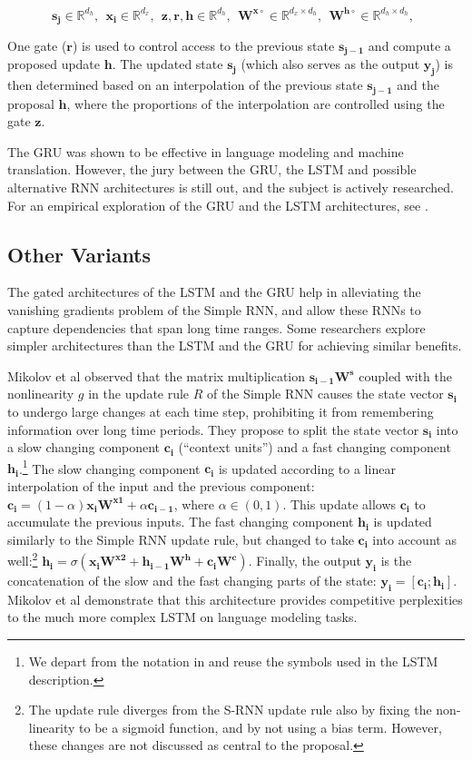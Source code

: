 \documentclass[jair,twoside,11pt,theapa]{article}
\newcommand{\m}[1]{\mathbf{#1}}%
\renewcommand{\shortcite}[0]{\citeyear}
\begin{document}
{\[
\m{s_j} \in \mathbb{R}^{d_h}, \,\;
\m{x_i} \in \mathbb{R}^{d_x}, \,\;
\m{z},\m{r},\m{h} \in \mathbb{R}^{d_h}, \,\;
\m{W^{x\circ}} \in \mathbb{R}^{d_x \times d_h}, \,\;
\m{W^{h\circ}} \in \mathbb{R}^{d_h \times d_h}, \,\;
\]

\noindent One gate ($\m{r}$) is used to control access to the previous state $\m{s_{j-1}}$ and compute a proposed update $\m{h}$. The updated state
$\m{s_j}$ (which also serves as the output $\m{y_j}$) is then determined based on an interpolation of the previous state $\m{s_{j-1}}$ and the proposal $\m{h}$,
where the proportions of the interpolation are controlled using the gate $\m{z}$.

The GRU was shown to be effective in language modeling and machine
translation.
However, the jury between the GRU, the LSTM and possible alternative
RNN architectures is still out, and the subject is actively researched.
For an empirical exploration of the GRU and the LSTM architectures, see
\cite{jozefowicz2015empirical}.

\subsection{Other Variants}
The gated architectures of the LSTM and the GRU help in alleviating the
vanishing gradients problem of the Simple RNN, and allow these RNNs to capture
dependencies that span long time ranges.
Some researchers explore simpler architectures than the LSTM and the GRU for
achieving similar benefits.

Mikolov et al \shortcite{mikolov2014learning} observed that the matrix
multiplication $\m{s_{i-1}}\m{W^{s}}$ coupled with the nonlinearity $g$ in the update rule $R$
of the Simple RNN causes the state vector $\m{s_i}$ to undergo large changes
at each time step, prohibiting it from remembering information over long time
periods. They propose to split the state vector $\m{s_i}$ into a slow changing component
$\m{c_i}$ (``context units'') and a fast changing component $\m{h_i}$.\footnote{We
depart from the notation in \cite{mikolov2014learning} and reuse the
symbols used in the LSTM description.}
The slow changing component $\m{c_i}$ is updated according to a linear interpolation
of the input and the previous component:
$\m{c_i} =
(1-\alpha)\m{x_i}\m{W^{x1}} + \alpha\m{c_{i-1}}$, where $\alpha \in (0,1)$. This
update allows $\m{c_i}$ to accumulate the previous inputs.  The fast changing
component $\m{h_i}$ is updated similarly to the Simple RNN update rule, 
but changed to take $\m{c_i}$ into account as well:\footnote{The update rule
diverges from the S-RNN update rule also by fixing the non-linearity to be
a sigmoid function, and by not using a bias term. However, these changes are
not discussed as central to the proposal.}
$\m{h_i} = \sigma(\m{x_i}\m{W^{x2}} + \m{h_{i-1}}\m{W^h} + \m{c_i}\m{W^c})$.
Finally, the output $\m{y_i}$ is the concatenation of the slow and the fast
changing parts of the state: $\m{y_i} = [\m{c_i};\m{h_i}]$.  Mikolov et al
demonstrate that this architecture provides competitive perplexities to
the much more complex LSTM on language modeling tasks.

}
\end{document}
